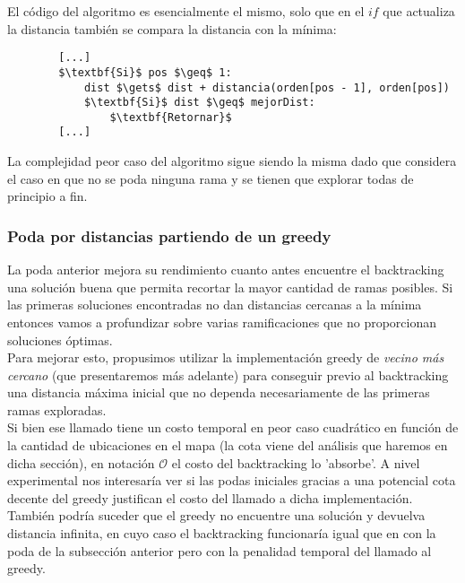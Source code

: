     El código del algoritmo es esencialmente el mismo, solo que en el $if$ que actualiza la distancia también se compara la distancia con la mínima:

    \begin{lstlisting}
        [...]
        $\textbf{Si}$ pos $\geq$ 1:
            dist $\gets$ dist + distancia(orden[pos - 1], orden[pos])
            $\textbf{Si}$ dist $\geq$ mejorDist:
                $\textbf{Retornar}$
        [...]
    \end{lstlisting}

    La complejidad peor caso del algoritmo sigue siendo la misma dado que considera el caso en que no se poda ninguna rama y se tienen que explorar todas de principio a fin.

    \subsubsection{Poda por distancias partiendo de un greedy}
    La poda anterior mejora su rendimiento cuanto antes encuentre el backtracking una solución buena que permita recortar la mayor cantidad de ramas posibles. Si las primeras soluciones encontradas no dan distancias cercanas a la mínima entonces vamos a profundizar sobre varias ramificaciones que no proporcionan soluciones óptimas.
    \\

    Para mejorar esto, propusimos utilizar la implementación greedy de \emph{vecino más cercano} (que presentaremos más adelante) para conseguir previo al backtracking una distancia máxima inicial que no dependa necesariamente de las primeras ramas exploradas.
    \\

    Si bien ese llamado tiene un costo temporal en peor caso cuadrático en función de la cantidad de ubicaciones en el mapa (la cota viene del análisis que haremos en dicha sección), en notación $\mathcal{O}$ el costo del backtracking lo 'absorbe'. A nivel experimental nos interesaría ver si las podas iniciales gracias a una potencial cota decente del greedy justifican el costo del llamado a dicha implementación.
    \\

    También podría suceder que el greedy no encuentre una solución y devuelva distancia infinita, en cuyo caso el backtracking funcionaría igual que en con la poda de la subsección anterior pero con la penalidad temporal del llamado al greedy.
